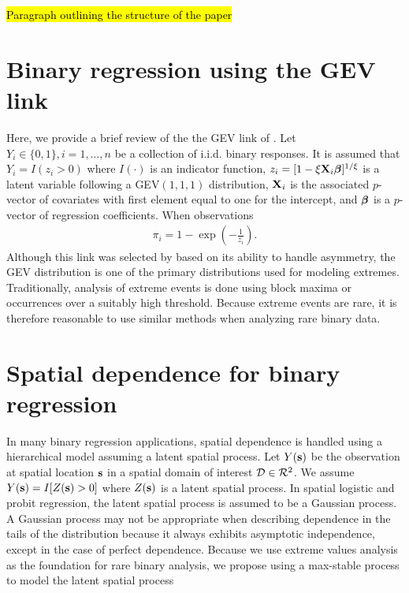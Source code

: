 \documentclass[11pt]{article}
\begin{document}
\hl{Paragraph outlining the structure of the paper}

\section{Binary regression using the GEV link}\label{rbs:rarebinary}

Here, we provide a brief review of the the GEV link of \citet{Wang2010}.
Let $Y_i \in \{0, 1\}, i = 1, \ldots, n$ be a collection of i.i.d. binary responses.
It is assumed that $Y_i = I(z_i > 0)$ where $I(\cdot)$ is an indicator function, $z_i = [1 - \xi \mbox{\bf X}_i \mbox{\boldmath $\beta$}]^{1 / \xi}$ is a latent variable following a GEV$(1, 1, 1)$ distribution, $\mbox{\bf X}_i$ is the associated $p$-vector of covariates with first element equal to one for the intercept, and $\mbox{\boldmath $\beta$}$ is a $p$-vector of regression coefficients.
When observations
\begin{align} \label{rbeq:gevlink}
  \pi_i= 1 - \exp \left( -\frac{ 1 }{ z_i } \right).
\end{align}
Although this link was selected by \citeauthor{Wang2010} based on its ability to handle asymmetry, the GEV distribution is one of the primary distributions used for modeling extremes.
Traditionally, analysis of extreme events is done using block maxima or occurrences over a suitably high threshold.
Because extreme events are rare, it is therefore reasonable to use similar methods when analyzing rare binary data.

\section{Spatial dependence for binary regression}

In many binary regression applications, spatial dependence is handled using a hierarchical model assuming a latent spatial process.
Let $Y(\mbox{\bf s})$ be the observation at spatial location $\mbox{\bf s}$ in a spatial domain of interest ${\cal D} \in {\cal R}^2$.
We assume $Y(\mbox{\bf s}) = I[Z(\mbox{\bf s}) > 0]$ where $Z(\mbox{\bf s})$ is a latent spatial process.
In spatial logistic and probit regression, the latent spatial process is assumed to be a Gaussian process.
A Gaussian process may not be appropriate when describing dependence in the tails of the distribution because it always exhibits asymptotic independence, except in the case of perfect dependence.
Because we use extreme values analysis as the foundation for rare binary analysis, we propose using a max-stable process to model the latent spatial process

\end{document}
